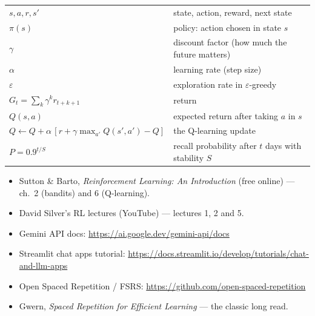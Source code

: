 \appendix
{}
\begin{center}
\renewcommand{\arraystretch}{1.25}
\begin{tabular}{@{}ll@{}}
\toprule
$s, a, r, s'$ & state, action, reward, next state\\
$\pi(s)$ & policy: action chosen in state $s$\\
$\gamma$ & discount factor (how much the future matters)\\
$\alpha$ & learning rate (step size)\\
$\varepsilon$ & exploration rate in $\varepsilon$-greedy\\
$G_t = \sum_k \gamma^k r_{t+k+1}$ & return\\
$Q(s,a)$ & expected return after taking $a$ in $s$\\
$Q \leftarrow Q + \alpha\,[r + \gamma\max_{a'} Q(s',a') - Q]$ & the Q-learning update\\
$P = 0.9^{t/S}$ & recall probability after $t$ days with stability $S$\\
\bottomrule
\end{tabular}
\end{center}

\begin{itemize}
  \item Sutton \& Barto, \emph{Reinforcement Learning: An Introduction} (free online) --- ch.\ 2 (bandits) and 6 (Q-learning).
  \item David Silver's RL lectures (YouTube) --- lectures 1, 2 and 5.
  \item Gemini API docs: \url{https://ai.google.dev/gemini-api/docs}
  \item Streamlit chat apps tutorial: \url{https://docs.streamlit.io/develop/tutorials/chat-and-llm-apps}
  \item Open Spaced Repetition / FSRS: \url{https://github.com/open-spaced-repetition}
  \item Gwern, \emph{Spaced Repetition for Efficient Learning} --- the classic long read.
\end{itemize}


